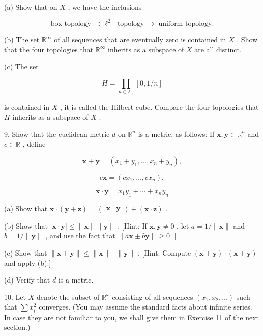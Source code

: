 \documentclass[10pt]{article}
\begin{document}
(a) Show that on \(X\) , we have the inclusions

\[
\text{ box topology } \supset  {\ell }^{2}\text{ -topology } \supset  \text{ uniform topology. }
\]

(b) The set \({\mathbb{R}}^{\infty }\) of all sequences that are eventually zero is contained in \(X\) . Show that the four topologies that \({\mathbb{R}}^{\infty }\) inherits as a subspace of \(X\) are all distinct.

(c) The set

\[
H = \mathop{\prod }\limits_{{n \in  {\mathbb{Z}}_{ + }}}\left\lbrack  {0,1/n}\right\rbrack
\]

is contained in \(X\) , it is called the Hilbert cube. Compare the four topologies that \(H\) inherits as a subspace of \(X\) .

9. Show that the euclidean metric \(d\) on \({\mathbb{R}}^{n}\) is a metric, as follows: If \(\mathbf{x},\mathbf{y} \in  {\mathbb{R}}^{n}\) and \(c \in  \mathbb{R}\) , define

\[
\mathbf{x} + \mathbf{y} = \left( {{x}_{1} + {y}_{1},\ldots ,{x}_{n} + {y}_{n}}\right) ,
\]

\[
c\mathbf{x} = \left( {c{x}_{1},\ldots ,c{x}_{n}}\right) ,
\]

\[
\mathbf{x} \cdot  \mathbf{y} = {x}_{1}{y}_{1} + \cdots  + {x}_{n}{y}_{n}
\]

(a) Show that \(\mathbf{x} \cdot  \left( {\mathbf{y} + \mathbf{z}}\right)  = \left( \begin{array}{ll} \mathbf{x} & \mathbf{y} \end{array}\right)  + \left( {\mathbf{x} \cdot  \mathbf{z}}\right)\) .

(b) Show that \(\left| {\mathbf{x} \cdot  \mathbf{y}}\right|  \leq  \parallel \mathbf{x}\parallel \parallel \mathbf{y}\parallel\) . [Hint: If \(\mathbf{x},\mathbf{y} \neq  0\) , let \(a = 1/\parallel \mathbf{x}\parallel\) and \(b = 1/\parallel \mathbf{y}\parallel\) , and use the fact that \(\parallel a\mathbf{x} \pm  b\mathbf{y}\parallel  \geq  0\) .]

(c) Show that \(\parallel \mathbf{x} + \mathbf{y}\parallel  \leq  \parallel \mathbf{x}\parallel  + \parallel \mathbf{y}\parallel\) . [Hint: Compute \(\left( {\mathbf{x} + \mathbf{y}}\right)  \cdot  \left( {\mathbf{x} + \mathbf{y}}\right)\) and apply (b).]

(d) Verify that \(d\) is a metric.

10. Let \(X\) denote the subset of \({\mathbb{R}}^{\omega }\) consisting of all sequences \(\left( {{x}_{1},{x}_{2},\ldots }\right)\) such that \(\sum {x}_{i}^{2}\) converges. (You may assume the standard facts about infinite series. In case they are not familiar to you, we shall give them in Exercise 11 of the next section.)
\end{document}
